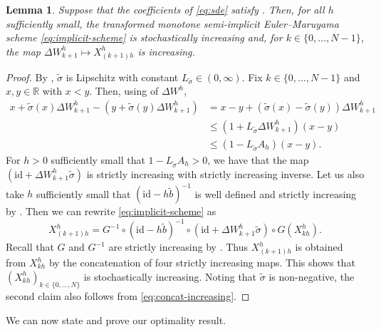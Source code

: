 \documentclass[onseside, final]{amsart}
\newtheorem{lemma}[theorem]{Lemma}
\theoremstyle{definition}
\newcommand{\R}{\mathbb R}
\newcommand{\id}{\mathrm{id}}
\numberwithin{equation}{section}
\begin{document}
		\begin{lemma}\label{lem:stochdom}
			Suppose that the coefficients of \eqref{eq:sde} satisfy . Then, for all $h$ sufficiently small, the transformed monotone semi-implicit Euler--Maruyama scheme \eqref{eq:implicit-scheme} is stochastically increasing and, for $k \in \{0, \dotsc, N - 1\}$, the map $\Delta W^h_{k+1} \mapsto X^h_{(k+1)h}$ is increasing.
		\end{lemma}
		
		\begin{proof}
			By , $\tilde \sigma$ is Lipschitz with constant $L_{\tilde \sigma} \in (0, \infty)$. Fix $k \in \{0, \dotsc, N - 1\}$ and $x, y \in \R$ with $x < y$. Then, using  of $\Delta W^h$,
			\begin{equation}
				\begin{split}
					x + \tilde \sigma(x) \Delta W^h_{k + 1} - (y + \tilde \sigma(y) \Delta W^h_{k + 1}) & = x - y + (\tilde \sigma(x) - \tilde \sigma(y))\Delta W^h_{k + 1}\\
					& \leq (1 + L_{\tilde \sigma} \Delta W^h_{k + 1})(x - y)\\
					& \leq (1 - L_{\tilde \sigma} A_h)(x - y).
				\end{split}
			\end{equation}
			For $h > 0$ sufficiently small that $1 - L_{\tilde \sigma}A_h > 0$, we have that the map $(\id + \Delta W^h_{k + 1} \tilde \sigma)$ is strictly increasing with strictly increasing inverse. Let us also take $h$ sufficiently small that $(\id - h \tilde b)^{-1}$ is well defined and strictly increasing by . Then we can rewrite \eqref{eq:implicit-scheme} as
			\begin{equation}\label{eq:concat-increasing}
				X^h_{(k + 1)h} = G^{-1} \circ (\id - h \tilde b)^{-1} \circ (\id + \Delta W^h_{k + 1} \tilde \sigma) \circ G (X^h_{kh}).
			\end{equation}
			Recall that $G$ and $G^{-1}$ are strictly increasing by . Thus $X^h_{(k + 1)h}$ is obtained from $X^h_{kh}$ by the concatenation of four strictly increasing maps. This shows that $(X^h_{kh})_{k \in \{0, \dotsc,  N\}}$ is stochastically increasing. Noting that $\tilde \sigma$ is non-negative, the second claim also follows from \eqref{eq:concat-increasing}.
		\end{proof}
	
		
		We can now state and prove our optimality result.
		
\end{document}
